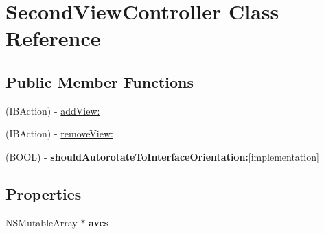 \hypertarget{interface_second_view_controller}{\section{Second\-View\-Controller Class Reference}
\label{interface_second_view_controller}
}
\subsection*{Public Member Functions}
\begin{DoxyCompactItemize}
\item 
(I\-B\-Action) -\/ \hyperlink{interface_second_view_controller_abd2ceb34046e497cc15743c448168ed4}{add\-View\-:}
\item 
(I\-B\-Action) -\/ \hyperlink{interface_second_view_controller_a0d9b10e294fd64ea3e4ec0ba4a7b6ca2}{remove\-View\-:}
\item 
\hypertarget{interface_second_view_controller_a3f0aeb78d9f8aeadbaa36fdbe503e3d6}{(B\-O\-O\-L) -\/ {\bfseries should\-Autorotate\-To\-Interface\-Orientation\-:}{\ttfamily  \mbox{[}implementation\mbox{]}}}\label{interface_second_view_controller_a3f0aeb78d9f8aeadbaa36fdbe503e3d6}

\end{DoxyCompactItemize}
\subsection*{Properties}
\begin{DoxyCompactItemize}
\item 
\hypertarget{interface_second_view_controller_a838b60d049d6f56622b07464371f32a3}{N\-S\-Mutable\-Array $\ast$ {\bfseries avcs}}\label{interface_second_view_controller_a838b60d049d6f56622b07464371f32a3}

\end{DoxyCompactItemize}



